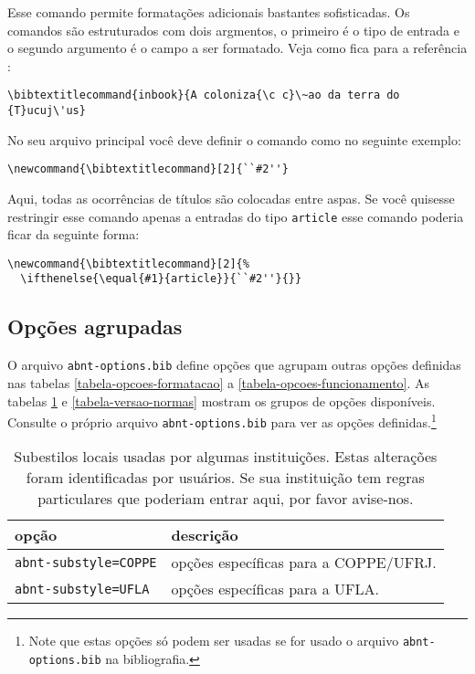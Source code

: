 \documentclass[a4paper]{ltxdoc}
\begin{document}
Esse comando permite formatações adicionais bastantes sofisticadas.
Os comandos são estruturados com dois argmentos, o primeiro é o tipo
de entrada e o segundo argumento é o campo a ser formatado.
Veja como fica para a referência :
\begin{verbatim}
\bibtextitlecommand{inbook}{A coloniza{\c c}\~ao da terra do {T}ucuj\'us}
\end{verbatim}

No seu arquivo principal você deve definir o comando como no seguinte exemplo:
\begin{verbatim}
\newcommand{\bibtextitlecommand}[2]{``#2''}
\end{verbatim}
Aqui, todas as ocorrências de títulos são colocadas entre aspas.
Se você quisesse restringir esse comando apenas a entradas do tipo {\tt article}
esse comando poderia ficar da seguinte forma:
\begin{verbatim}
\newcommand{\bibtextitlecommand}[2]{%
  \ifthenelse{\equal{#1}{article}}{``#2''}{}}
\end{verbatim}

\clearpage
\subsection{Opções agrupadas}

O arquivo {\tt abnt-options.bib} define opções que agrupam outras opções
definidas nas tabelas \ref{tabela-opcoes-formatacao} a \ref{tabela-opcoes-funcionamento}.
As tabelas \ref{tabela-subestilos} e \ref{tabela-versao-normas} mostram
os grupos de opções disponíveis. Consulte o próprio arquivo {\tt abnt-options.bib}
para ver as opções 
definidas.\footnote{Note que estas opções só podem ser usadas se for usado o arquivo  {\tt abnt-options.bib}
na bibliografia.}

\begin{table}[htbp]
\begin{center}
\begin{tabular}{lp{9cm}}\hline\hline
opção  & descrição \\ \hline
{\tt abnt-substyle=COPPE} & opções específicas para a COPPE/UFRJ.\\
{\tt abnt-substyle=UFLA} & opções específicas para a UFLA.\\
\hline\hline
\end{tabular}
\end{center}
\caption[Subestilos de diversas instituições]{
Subestilos locais usadas por algumas instituições. Estas alterações
foram identificadas por usuários. Se sua instituição
tem regras particulares que poderiam entrar aqui, por favor avise-nos.}
\label{tabela-subestilos}
\end{table}
\end{document}
